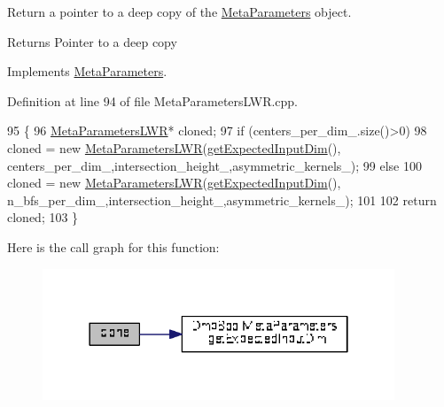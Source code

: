 Return a pointer to a deep copy of the \hyperlink{classDmpBbo_1_1MetaParameters}{Meta\+Parameters} object. 

\begin{DoxyReturn}{Returns}
Pointer to a deep copy 
\end{DoxyReturn}


Implements \hyperlink{classDmpBbo_1_1MetaParameters_a93ea31a71a0956a7031f060b2d439641}{Meta\+Parameters}.



Definition at line 94 of file Meta\+Parameters\+L\+W\+R.\+cpp.


\begin{DoxyCode}
95 \{
96   \hyperlink{classDmpBbo_1_1MetaParametersLWR_ab75a1ee01157d2cc69a2a2335e344a2e}{MetaParametersLWR}* cloned;
97   \textcolor{keywordflow}{if} (centers\_per\_dim\_.size()>0)
98     cloned =  \textcolor{keyword}{new} \hyperlink{classDmpBbo_1_1MetaParametersLWR_ab75a1ee01157d2cc69a2a2335e344a2e}{MetaParametersLWR}(\hyperlink{classDmpBbo_1_1MetaParameters_af5a550bcf65d5a29a153a594cc4e3fa1}{getExpectedInputDim}(),
      centers\_per\_dim\_,intersection\_height\_,asymmetric\_kernels\_);
99   \textcolor{keywordflow}{else}
100     cloned =  \textcolor{keyword}{new} \hyperlink{classDmpBbo_1_1MetaParametersLWR_ab75a1ee01157d2cc69a2a2335e344a2e}{MetaParametersLWR}(\hyperlink{classDmpBbo_1_1MetaParameters_af5a550bcf65d5a29a153a594cc4e3fa1}{getExpectedInputDim}(),
      n\_bfs\_per\_dim\_,intersection\_height\_,asymmetric\_kernels\_);
101   
102   \textcolor{keywordflow}{return} cloned;
103 \}
\end{DoxyCode}


Here is the call graph for this function\+:
\nopagebreak
\begin{figure}[H]
\begin{center}
\leavevmode
\includegraphics[width=298pt]{classDmpBbo_1_1MetaParametersLWR_a4bdcb8bc45561f96baec20aa5fe4df13_cgraph}
\end{center}
\end{figure}


